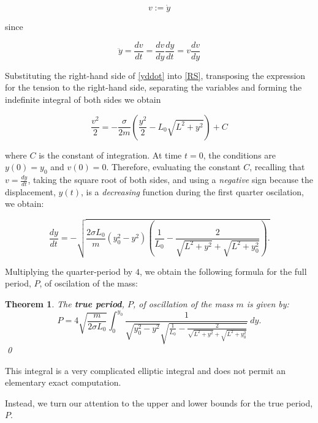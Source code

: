 \documentclass[12pt]{article}
\newtheorem{thm}{Theorem}
\numberwithin{equation}{section}
\begin{document}
\begin{equation}
\label{v}
v:=\dot{y}
\end{equation}

\noindent since

\begin{equation}
\label{yddot}
\ddot{y}=\frac{dv}{dt}=\frac{dv}{dy}\frac{dy}{dt}=v\frac{dv}{dy}
\end{equation}

Substituting the right-hand side of \eqref{yddot} into \eqref{RS}, transposing the expression for the tension to the right-hand side, separating the variables and forming the indefinite integral of both sides we obtain

\begin{equation}
\label{ }
\frac{v^2}{2}=-\frac{\sigma}{2m}\left(\frac{y^2}{2}-L_0\sqrt{L^2+y^2}\right)+C
\end{equation}

\noindent where $C$ is the constant of integration.  At time $t=0$, the conditions are $y(0)=y_0$ and $v(0)=0$.  Therefore, evaluating the constant $C$, recalling that $v=\frac{dy}{dt}$,  taking the square root of both sides, and using a \emph{negative} sign because the displacement, $y(t)$, is a \emph{decreasing} function during the first quarter oscilation, we obtain:

\begin{equation}
\label{ }
\frac{dy}{dt}=-\sqrt{\frac{2\sigma L_0}{m}(y_0^2-y^2)\left(\frac{1}{L_0}-\frac{2}{\sqrt{L^2+y^2}+\sqrt{L^2+y_0^2}}\right).}
\end{equation}

Multiplying the quarter-period by $4$, we obtain the following formula for the full period, $P$, of oscilation of the mass:


\begin{thm}
The \textbf{true period}, $P$, of oscillation of the mass $m$ is given by:
\begin{equation}
\label{P}
\boxed{P=4\sqrt{\frac{m}{2\sigma L_0}}\int_{0}^{y_0}\frac{1}{\sqrt{y_0^2-y^2}\sqrt{\frac{1}{L_0}-\frac{2}{\sqrt{L^2+y^2}+\sqrt{L^2+y_0^2}}}}~dy.}
\end{equation}
\qed
\end{thm}

This integral is a very complicated elliptic integral and does not permit an elementary exact computation.

Instead, we turn our attention to the upper and lower bounds for the true period, $P$.

\end{document}
